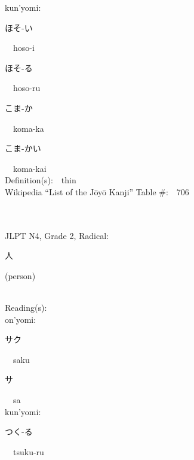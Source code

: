 \begin{multicols}{2}
{\hspace*{1em}}kun'yomi:\ \ \\
{\hspace*{2em}}{\begin{CJK}{UTF8}{min} ほそ-い \end{CJK}}\ \ hoso-i\ \ \\
{\hspace*{2em}}{\begin{CJK}{UTF8}{min} ほそ-る \end{CJK}}\ \ hoso-ru\ \ \\
{\hspace*{2em}}{\begin{CJK}{UTF8}{min} こま-か \end{CJK}}\ \ koma-ka\ \ \\
{\hspace*{2em}}{\begin{CJK}{UTF8}{min} こま-かい \end{CJK}}\ \ koma-kai\ \ \\
Definition(s):\ \ thin \\
Wikipedia ``List of the J\=oy\=o Kanji'' Table \#:\ \ 706 \\
\ \ \\
{\fontsize{34pt}{40pt}  }\ \ \\  %
{JLPT N4, Grade 2, Radical:\ \ {\begin{CJK}{UTF8}{min} 人 \end{CJK}} (person) } \\
Reading(s):\ \ \\
{\hspace*{1em}}on'yomi:\ \ \\
{\hspace*{2em}}{\begin{CJK}{UTF8}{min} サク \end{CJK}}\ \ saku\ \ \\
{\hspace*{2em}}{\begin{CJK}{UTF8}{min} サ \end{CJK}}\ \ sa\ \ \\
{\hspace*{1em}}kun'yomi:\ \ \\
{\hspace*{2em}}{\begin{CJK}{UTF8}{min} つく-る \end{CJK}}\ \ tsuku-ru\ \ \\

\end{multicols}
